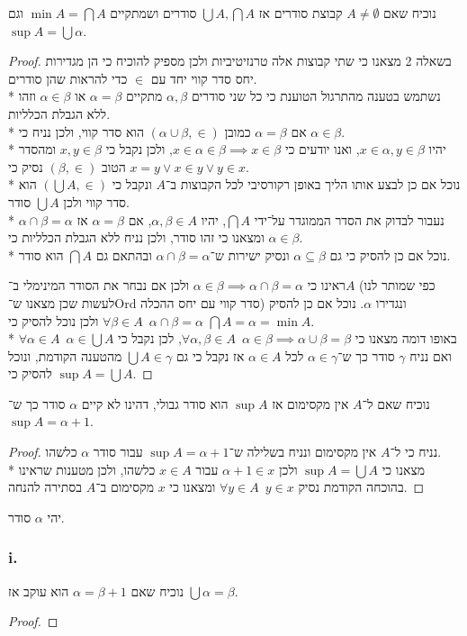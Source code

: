 \Question{}
\Subquestion{}
נוכיח שאם $A \ne \emptyset$ קבוצת סודרים אז $\bigcup A, \bigcap A$ סודרים ושמתקיים $\min A = \bigcap A$ וגם $\sup A = \bigcup \alpha$.
\begin{proof}
	בשאלה 2 מצאנו כי שתי קבוצות אלה טרנזיטיביות ולכן מספיק להוכיח כי הן מגדירות יחס סדר קווי יחד עם $\in$ כדי להראות שהן סודרים. \\*
	נשתמש בטענה מהתרגול הטוענת כי כל שני סודרים $\alpha, \beta$ מתקיים $\alpha = \beta$ או $\alpha \in \beta$ וזהו ללא הגבלת הכלליות. \\*
	אם $\alpha = \beta$ כמובן $(\alpha \cup \beta, \in)$ הוא סדר קווי, ולכן נניח כי $\alpha \in \beta$. \\*
	יהיו $x \in \alpha, y \in \beta$, ואנו יודעים כי $x \in \alpha \in \beta \implies x \in \beta$, ולכן נקבל כי $x, y \in \beta$ ומהסדר הטוב $(\beta, \in)$ נסיק כי $x = y \lor x \in y \lor y \in x$. \\*
	נוכל אם כן לבצע אותו הליך באופן רקורסיבי לכל הקבוצות ב־$A$ ונקבל כי $(\bigcup A, \in)$ הוא סדר קווי ולכן $\bigcup A$ סודר. \\*
	נעבור לבדוק את הסדר הממוגדר על־ידי $\bigcap A$, יהיו $\alpha, \beta \in A$, אם $\alpha = \beta$ אז $\alpha \cap \beta = \alpha$ ומצאנו כי זהו סודר, ולכן נניח ללא הגבלת הכלליות כי $\alpha \in \beta$. \\*
	נוכל אם כן להסיק כי גם $\alpha \subseteq \beta$ ונסיק ישירות ש־$\alpha \cap \beta = \alpha$ ובהתאם גם $\bigcap A$ הוא סודר.

	ראינו כי $\alpha \in \beta \implies \alpha \cap \beta = \alpha$ ולכן אם נבחר את הסודר המינימלי ב־$A$ (כפי שמותר לנו לעשות שכן מצאנו ש־Ord סדר קווי עם יחס ההכלה) ונגדירו $\alpha$.
	נוכל אם כן להסיק $\forall \beta \in A \enspace \alpha \cap \beta = \alpha$ ולכן נוכל להסיק כי $\bigcap A = \alpha = \min A$. \\*
	באופו דומה מצאנו כי $\forall \alpha, \beta \in A \enspace \alpha \in \beta \implies \alpha \cup \beta = \beta$,
	לכן נקבל כי $\forall \alpha \in A \enspace \alpha \in \bigcup A$ ואם נניח $\gamma$ סודר כך ש־$\alpha \in \gamma$ לכל $\alpha \in A$ אז נקבל כי גם $\bigcup A \in \gamma$ מהטענה הקודמת, ונוכל להסיק כי $\sup A = \bigcup A$.
\end{proof}

\Subquestion{}
נוכיח שאם ל־$A$ אין מקסימום אז $\sup A$ הוא סודר גבולי, דהינו לא קיים $\alpha$ סודר כך ש־$\sup A = \alpha + 1$.
\begin{proof}
	נניח כי ל־$A$ אין מקסימום ונניח בשלילה ש־$\sup A = \alpha + 1$ עבור סודר $\alpha$ כלשהו. \\*
	מצאנו כי $\sup A = \bigcup A$ ולכן $\alpha + 1 \in x$ עבור $x \in A$ כלשהו, ולכן מטענות שראינו בהוכחה הקודמת נסיק $\forall y \in A \enspace y \in x$ ומצאנו כי $x$ מקסימום ב־$A$ בסתירה להנחה.
\end{proof}

\Question{}
\Subquestion{}
יהי $\alpha$ סודר.

\subsubsection{i.}
נוכיח שאם $\alpha = \beta + 1$ הוא עוקב אז $\bigcup \alpha = \beta$.
\begin{proof}
	
\end{proof}


